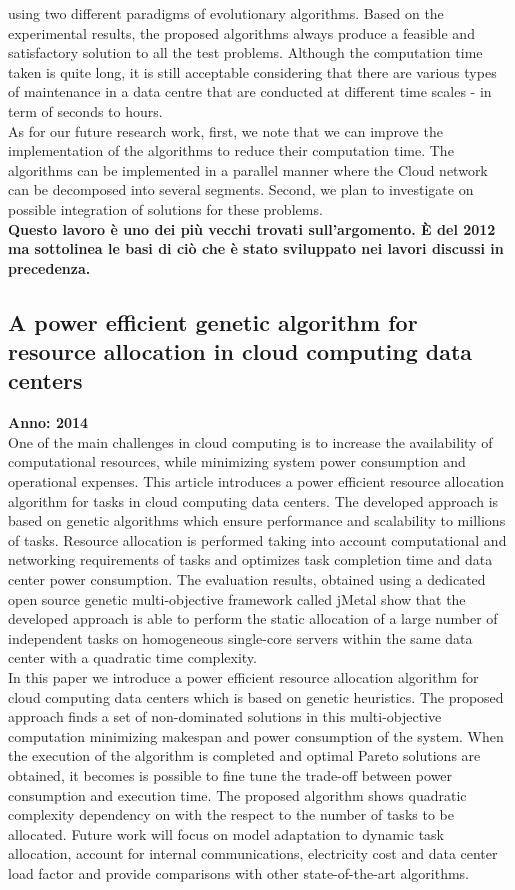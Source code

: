 using two different paradigms of evolutionary algorithms.
Based on the experimental results, the proposed algorithms
always produce a feasible and satisfactory solution to all the
test problems. Although the computation time taken is quite
long, it is still acceptable considering that there are various
types of maintenance in a data centre that are conducted at
different time scales - in term of seconds to hours.\\
As for our future research work, first, we note that we can
improve the implementation of the algorithms to reduce their
computation time. The algorithms can be implemented in a
parallel manner where the Cloud network can be decomposed
into several segments. Second, we plan to investigate on
possible integration of solutions for these problems.\\

\textbf{Questo lavoro è uno dei più vecchi trovati sull'argomento. È del 2012 ma sottolinea le basi di ciò che è stato sviluppato nei lavori discussi in precedenza.}


\subsection{A power efficient genetic algorithm for resource allocation in cloud computing data centers}
\textbf{Anno: 2014}~\cite{portaluri2014power}\\
One of the main challenges in cloud computing is to increase the availability of computational resources, while minimizing system power consumption and operational expenses. 
This article introduces a power efficient resource allocation algorithm for tasks in cloud computing data centers. 
The developed approach is based on genetic algorithms which ensure performance and scalability to millions of tasks. 
Resource allocation is performed taking into account computational and networking requirements of tasks and optimizes task completion time and data center power consumption.
The evaluation results, obtained using a dedicated open source genetic multi-objective framework called jMetal show that the developed approach is able to perform the static 
allocation of a large number of independent tasks on homogeneous single-core servers within the same data center with a quadratic time complexity.\\

In this paper we introduce a power efficient resource allocation algorithm for cloud computing data centers which is based on genetic heuristics. 
The proposed approach finds a set of non-dominated solutions in this multi-objective computation minimizing makespan and power consumption of the system.
When the execution of the algorithm is completed and optimal Pareto solutions are obtained, it becomes is possible to fine
tune the trade-off between power consumption and execution time. 
The proposed algorithm shows quadratic complexity dependency on with the respect to the number of tasks to be allocated.
Future work will focus on model adaptation to dynamic task allocation, account for internal communications, electricity
cost and data center load factor and provide comparisons with other state-of-the-art algorithms.\\

